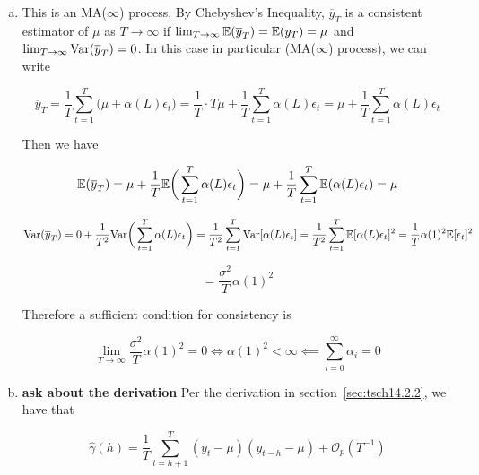 \begin{enumerate}[(a)]

\item 
This is an MA(\(\infty\)) process. By Chebyshev's Inequality, \(\overline{y}_T\) is a consistent estimator of \(\mu\) as \(T \to \infty\) if \(\lim_{T \to \infty} \mathbb{E}(\overline{y}_T) = \mathbb{E}(y_T) = \mu\) and \(\lim_{T \to \infty} \mathrm{Var}(\overline{y}_T) = 0\). In this case in particular (MA(\(\infty\)) process), we can write

\[
\overline{y}_T = \frac{1}{T} \sum_{t=1}^T \big( \mu + \alpha(L)\epsilon_t \big) = \frac{1}{T}\cdot T \mu + \frac{1}{T} \sum_{t=1}^T \alpha(L)\epsilon_t = \mu + \frac{1}{T}\sum_{t=1}^T \alpha(L)\epsilon_t 
\]

Then we have

\[
\mathbb{E}(\overline{y}_T) = \mu + \frac{1}{T}\mathbb{E} \bigg( \sum_{t=1}^T \alpha(L)\epsilon_t  \bigg)  = \mu + \frac{1}{T} \sum_{t=1}^T  \mathbb{E} ( \alpha(L)\epsilon_t  ) = \mu
\]

\[
\mathrm{Var}(\overline{y}_T) = 0 + \frac{1}{T^2} \mathrm{Var} \bigg( \sum_{t=1}^T \alpha(L)\epsilon_t  \bigg) = \frac{1}{T^2} \sum_{t=1}^T \mathrm{Var}[ \alpha(L)\epsilon_t ] = \frac{1}{T^2} \sum_{t=1}^T \mathbb{E}[ \alpha(L)\epsilon_t ] ^2 = \frac{1}{T} \alpha(1)^2 \mathbb{E}[\epsilon_t ] ^2
\]

\[
= \frac{\sigma^2}{T} \alpha(1)^2
\]

Therefore a sufficient condition for consistency is 

\[
\lim_{T \to \infty}  \frac{\sigma^2}{T} \alpha(1)^2 = 0 \iff \alpha(1)^2 < \infty \impliedby \boxed{\sum_{i=0}^\infty \alpha_i = 0}
\]

\item 


 \textbf{ask about the derivation}  Per the derivation in section~\ref{sec:tsch14.2.2}, we have that

%

\[
\hat{\gamma}(h)  = \frac{1}{T} \sum_{t=h+1}^T(y_t - \mu)(y_{t-h} - \mu) + \mathcal{O}_p(T^{-1})
\]


\end{enumerate}

